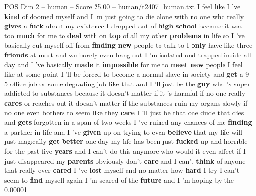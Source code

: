 \begin{textsample}{POS Dim 2 – human – Score 25.00 – human/t2407\_human.txt}  \label{ex:f2_pos_023}
I feel like I ’ve \textbf{kind} of doomed myself and I ’m just going to die alone with no one who really \textbf{gives} a \textbf{fuck} about my existence I dropped out of \textbf{high} \textbf{school} because it was too \textbf{much} for me to \textbf{deal} with on \textbf{top} of all my other \textbf{problems} in life so I ’ve basically cut myself off from \textbf{finding} \textbf{new} people to talk to I \textbf{only} have like three \textbf{friends} at most and we barely even hang out I ’m isolated and trapped inside all day and I ’ve basically \textbf{made} it \textbf{impossible} for me to \textbf{meet} \textbf{new} people I feel like at some point I ’ll be forced to become a normal slave in society and \textbf{get} a 9-5 office job or some degrading job like that and I ’ll just be the \textbf{guy} who ’s super addicted to substances because it doesn't matter if it ’s harmful if no one really \textbf{cares} or reaches out it doesn't matter if the substances ruin my organs slowly if no one even bothers to seem like they \textbf{care} I ’ll just be that one dude that dies and \textbf{gets} forgotten in a span of two weeks I ’ve ruined any chances of me \textbf{finding} a partner in life and I ’ve \textbf{given} up on trying to even \textbf{believe} that my life will just magically \textbf{get} \textbf{better} one day my life has been just \textbf{fucked} up and horrible for the past five \textbf{years} and I can't do this anymore who would it even affect if I just disappeared my \textbf{parents} obviously don't \textbf{care} and I can't \textbf{think} of anyone that really ever \textbf{cared} I ’ve \textbf{lost} myself and no matter how \textbf{hard} I try I can't seem to \textbf{find} myself again I ’m scared of the \textbf{future} and I ’m hoping by the 0.00001 %

\end{textsample}
